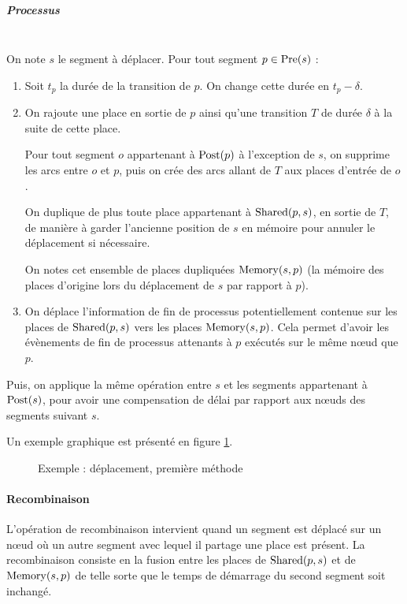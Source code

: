 \subparagraph{Processus} ~ \\

On note $s$ le segment à déplacer.
Pour tout segment $p \in \operatorname{Pre}(s)$ : 

\begin{enumerate}
\item Soit $t_p$ la durée de la transition de $p$. On change cette durée en $t_p - \delta$.
\item On rajoute une place en sortie de $p$ ainsi qu'une transition $T$ de durée $\delta$ à la suite de cette place. 

Pour tout segment $o$ appartenant à $\operatorname{Post}(p)$ à l'exception de $s$, on supprime les arcs entre $o$ et $p$, puis on crée des arcs allant de $T$ aux places d'entrée de $o$.

On duplique de plus toute place appartenant à $\operatorname{Shared}(p, s)$, en sortie de $T$, de manière à garder l'ancienne position de $s$ en mémoire pour annuler le déplacement si nécessaire.

On notes cet ensemble de places dupliquées $\operatorname{Memory}(s, p)$ (la mémoire des places d'origine lors du déplacement de $s$ par rapport à $p$).
 
\item On déplace l'information de fin de processus potentiellement contenue sur les places de $\operatorname{Shared}(p, s)$ vers les places  $\operatorname{Memory}(s, p)$. Cela permet d'avoir les évènements de fin de processus attenants à $p$ exécutés sur le même nœud que $p$.
\end{enumerate}

Puis, on applique la même opération entre $s$ et les segments appartenant à $\operatorname{Post}(s)$, pour avoir une compensation de délai par rapport aux nœuds des segments suivant $s$.

Un exemple graphique est présenté en figure \ref{fig:deplacementMethode1}.

\begin{figure}[h!]
\centering

\caption{Exemple : déplacement, première méthode}
\label{fig:deplacementMethode1}
\end{figure}

\paragraph{Recombinaison}
L'opération de recombinaison intervient quand un segment est déplacé sur un nœud où un autre segment avec lequel il partage une place est présent.
La recombinaison consiste en la fusion entre les places de $\operatorname{Shared}(p, s)$ et de  $\operatorname{Memory}(s, p)$ de telle sorte que le temps de démarrage du second segment soit inchangé.

